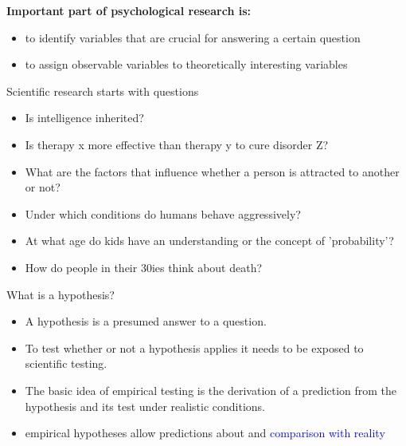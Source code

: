 \documentclass[]{beamer}
\begin{document}
\begin{frame}
\begin{Large}
\textbf{Important part of psychological research is:}
\vspace{5mm}
\end{Large}
\begin{itemize}
\setlength{\itemsep}{10pt}
 \item to identify variables that are crucial for answering a certain
question 
 \item to assign observable variables to theoretically interesting variables 
\end{itemize}
\end{frame}


\begin{frame}{Scientific research starts with questions}
\begin{itemize}
\setlength{\itemsep}{5pt}
 \item Is intelligence inherited?
 \item Is therapy x more effective than therapy y to cure disorder Z?
 \item What are the factors that influence whether a person is attracted to
another or not?
 \item Under which conditions do humans behave aggressively? 
 \item At what age do kids have an understanding or the concept of
'probability'?
 \item How do people in their 30ies think about death?
\end{itemize}
\end{frame}

\begin{frame}{What is a hypothesis?}
\begin{itemize}
 \item<2-> A hypothesis is a presumed answer to a question.
 \item<3-> To test whether or not a hypothesis applies it needs to be exposed to scientific testing. 
 \item<4-> The basic idea of empirical testing is the derivation of a prediction from the hypothesis and its test under realistic conditions.
 \item<5-> [!] empirical hypotheses allow predictions about and \textcolor{blue}{comparison with reality}
\end{itemize}
\end{frame}
\end{document}
